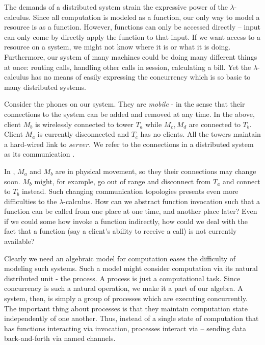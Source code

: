 The demands of a distributed system strain the expressive power of the $\lambda$-calculus.  Since all computation is modeled as a function, our only way to model a resource is as a function.  However, functions can only be accessed directly -- input can only come by directly apply the function to that input.  If we want access to a resource on a system, we might not know where it is or what it is doing.  Furthermore, our system of many machines could be doing many different things at once: routing calls, handling other calls in session, calculating a bill.  Yet the $\lambda$-calculus has no means of easily expressing the concurrency which is so basic to many distributed systems.


Consider the phones on our system.  They are \emph{mobile} - in the sense that their connections to the system can be added and removed at any time.  In the  above, client $M_b$ is wirelessly connected to tower $T_a$ while $M_c,M_d$ are connected to $T_b$.  Client $M_a$ is currently disconnected and $T_c$ has no clients.  All the towers maintain a hard-wired link to $server$.  We refer to the connections in a distributed system as its communication .

In , $M_a$ and $M_b$ are in physical movement, so they their connections may change soon.  $M_b$ might, for example, go out of range and disconnect from $T_a$ and connect to $T_b$ instead.  Such changing communication topologies presents even more difficulties to the $\lambda$-calculus.  How can we abstract function invocation such that a function can be called from one place at one time, and another place later?  Even if we could some how invoke a function indirectly, how could we deal with the fact that a function (say a client's ability to receive a call) is not currently available?

Clearly we need an algebraic model for computation eases the difficulty of modeling such systems.  Such a model might consider computation via its natural distributed unit - the process.  A process is just a computational task.  Since concurrency is such a natural operation, we make it a part of our algebra.  A system, then, is simply a group of processes which are executing concurrently. The important thing about processes is that they maintain computation state independently of one another.  Thus, instead of a single state of computation that has functions interacting via invocation, processes interact via  -- sending data back-and-forth via named channels.  

